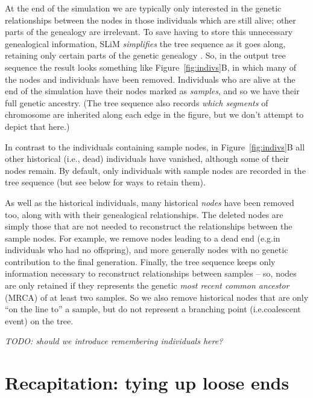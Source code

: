 \documentclass[12pt]{article}
\newcommand*{\eg}{e.g.\xcomma}
\newcommand*{\ie}{i.e.\xcomma}
\newcommand{\comment}[1]{\textit{\color{green} #1}}
\begin{document}
At the end of the simulation we are typically only interested in the genetic
relationships between the nodes in those individuals which are still alive;
other parts of the genealogy are irrelevant.
To save having to store this unnecessary genealogical information,
SLiM \textit{simplifies} the tree sequence as it goes along, retaining
only certain parts of the genetic genealogy \citep{kelleher}.
So, in the output tree sequence the result looks something like Figure~\ref{fig:indivs}B,
in which many of the nodes and individuals have been removed.
Individuals who are alive at the end of the simulation
have their nodes marked as \textit{samples},
and so we have their full genetic ancestry.
(The tree sequence also records \emph{which segments} of chromosome are inherited
along each edge in the figure, but we don't attempt to depict that here.)

In contrast to the individuals containing sample nodes,
in Figure~\ref{fig:indivs}B
all other historical (i.e., dead) individuals have vanished,
although some of their nodes remain.
By default, only individuals with sample nodes are recorded in the tree sequence
(but see below for ways to retain them).

As well as the historical individuals, many historical \textit{nodes} have been removed too,
along with with their genealogical relationships.
The deleted nodes are simply those that are
not needed to reconstruct the relationships between the sample nodes.
For example, we remove nodes leading to a dead end
(\eg in individuals who had no offspring),
and more generally nodes with no genetic contribution to the final generation.
Finally, the tree sequence keeps only information necessary
to reconstruct relationships between samples --
so, nodes are only retained if they
represents the genetic \textit{most recent common ancestor} (MRCA) of at least two samples.
So we also remove historical nodes that are only ``on the line to'' a sample,
but do not represent a branching point (\ie coalescent event) on the tree.

\comment{TODO: should we introduce remembering individuals here?}



\section{Recapitation: tying up loose ends}
\end{document}
